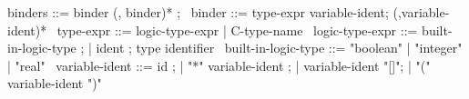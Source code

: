 \begin{syntax}
  binders ::= binder (, binder)* ;
  \
  binder ::= type-expr variable-ident;
             (,variable-ident)*
  \
  type-expr ::= logic-type-expr | C-type-name
  \
  logic-type-expr ::= built-in-logic-type ;
  | ident ; type identifier
  \
  built-in-logic-type ::= "boolean" | "integer" | "real"
  \
  variable-ident ::= id ;
  | "*" variable-ident ;
  | variable-ident "[]";
  | "(" variable-ident ")"
\end{syntax}
